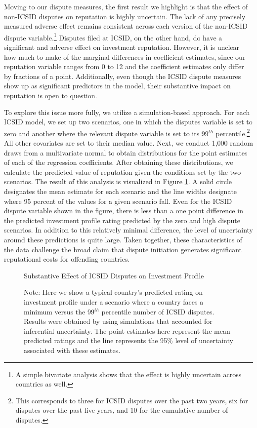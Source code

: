 \documentclass[12pt,onesided]{amsart}
\begin{document}
Moving to our dispute measures, the first result we highlight is that the effect of non-ICSID disputes on reputation is highly uncertain. The lack of any precisely measured adverse effect remains consistent across each version of the non-ICSID dispute variable.\footnote{A simple bivariate analysis shows that the effect is highly uncertain across countries as well.} Disputes filed at ICSID, on the other hand, do have a significant and adverse effect on investment reputation. However, it is unclear how much to make of the marginal differences in coefficient estimates, since our reputation variable ranges from 0 to 12 and the coefficient estimates only differ by fractions of a point. Additionally, even though the ICSID dispute measures show up as significant predictors in the model, their substantive impact on reputation is open to question. 

To explore this issue more fully, we utilize a simulation-based approach. For each ICSID model, we set up two scenarios, one in which the disputes variable is set to zero and another where the relevant dispute variable is set to its 99$^{th}$ percentile.\footnote{This corresponds to three for ICSID disputes over the past two years, six for disputes over the past five years, and 10 for the cumulative number of disputes.} All other covariates are set to their median value. Next, we conduct 1,000 random draws from a multivariate normal to obtain distributions for the point estimates of each of the regression coefficients. After obtaining these distributions, we calculate the predicted value of reputation given the conditions set by the two scenarios. The result of this analysis is visualized in Figure \ref{fig:subEffect}. A solid circle designates the mean estimate for each scenario and the line widths designate where 95 percent of the values for a given scenario fall. Even for the ICSID dispute variable shown in the figure, there is less than a one point difference in the predicted investment profile rating predicted by the zero and high dispute scenarios. In addition to this relatively minimal difference, the level of uncertainty around these predictions is quite large. Taken together, these characteristics of the data challenge the broad claim that dispute initiation generates significant reputational costs for offending countries.

\begin{figure}[ht]
	\centering
	\caption{Substantive Effect of ICSID Disputes on Investment Profile}
	\label{fig:subEffect}
	\resizebox{1\textwidth}{!}{}
	\caption*{Note: Here we show a typical country's predicted rating on investment profile under a scenario where a country faces a minimum versus the 99$^{th}$ percentile number of ICSID disputes. Results were obtained by using simulations that accounted for inferential uncertainty. The point estimates here represent the mean predicted ratings and the line represents the 95\% level of uncertainty associated with these estimates.}
\end{figure}
\FloatBarrier
\end{document}
